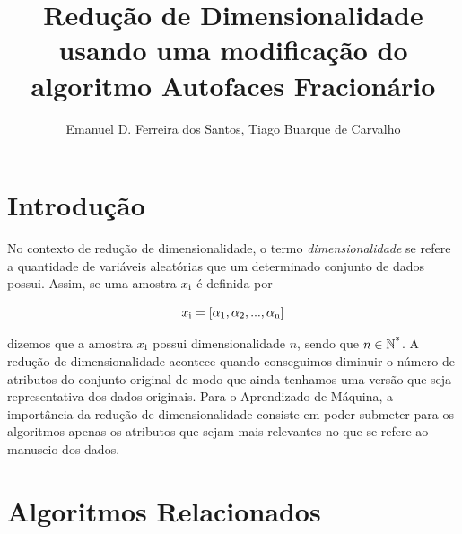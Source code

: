 \documentclass[12pt]{article}
\begin{document}
\title{Redução de Dimensionalidade usando uma modificação do algoritmo Autofaces Fracionário}
\author{Emanuel D. Ferreira dos Santos, Tiago Buarque de Carvalho}
\maketitle


\section{Introdução}

No contexto de redução de dimensionalidade, o termo \textit{dimensionalidade} se refere a quantidade de variáveis aleatórias que um determinado conjunto de dados possui. Assim, se uma amostra $x\textsubscript{i}$ é definida por

$$
x\textsubscript{i} = [\alpha\textsubscript{1},\alpha\textsubscript{2},...,\alpha\textsubscript{n}]
$$

dizemos que a amostra $x\textsubscript{i}$ possui dimensionalidade $n$, sendo que $n \in \mathbb{N}\textsuperscript{*} $.\linebreak
\indent A redução de dimensionalidade acontece quando conseguimos diminuir o número de atributos do conjunto original de modo que ainda tenhamos uma versão que seja representativa dos dados originais.\linebreak
\indent Para o Aprendizado de Máquina, a importância da redução de dimensionalidade consiste em poder submeter para os algoritmos apenas os atributos que sejam mais relevantes no que se refere ao manuseio dos dados.

\section{Algoritmos Relacionados}
\end{document}

